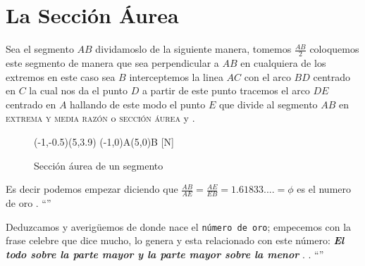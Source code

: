 \section{La Sección Áurea}

Sea el segmento $AB$ dividamoslo de la siguiente manera, tomemos $\frac{AB}{2}$ coloquemos este segmento de manera que sea perpendicular a $AB$ en cualquiera de los extremos en este caso sea $B$ interceptemos la linea $AC$ con el arco $BD$ centrado en $C$ la cual nos da el punto $D$ a partir de este punto tracemos el arco $DE$ centrado en $A$ hallando de este modo el punto $E$ que divide al segmento $AB$ en \textsc{extrema y media razón} o \textsc{sección áurea} \cite{Phillips} y \cite{variablei}.

\begin{figure}[!ht]
	\begin{center}
		\begin{pspicture}[showgrid=false](-1,-0.5)(5,3.9)
			\pstGeonode[PosAngle={-180,-35},unit=1cm,CurveType=polyline](-1,0){A}(5,0){B}
			[N]
		\end{pspicture}
	\end{center}
	\caption{Sección áurea de un segmento}
	\label{Hw}
\end{figure}

Es decir podemos empezar diciendo que $\frac{AB}{AE}=\frac{AE}{EB}=1.61833....=\phi $ es el numero de oro \cite{surhone2010shapiro}  \cite{jackson2012research}. ``''

Deduzcamos y averigüemos de donde nace el \texttt{número de oro}; empecemos con la frase celebre que dice mucho, lo genera y esta relacionado con este  número: \textbf{\textit{El todo sobre la parte mayor y la parte mayor sobre la menor}} \cite{Heinz}. \cite{hilbert2020geometry}. ``''

